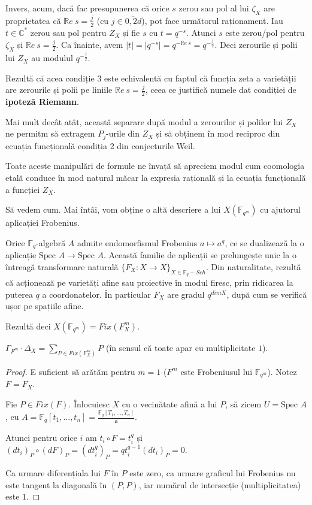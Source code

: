 \documentclass[13pt,openany]{book}
\begin{document}
Invers, acum, dacă fac presupunerea că orice $s$ zerou sau pol al lui $\zeta_X$ are proprietatea că $\mathbb{R}e\ s=\frac{j}{2}$ (cu $j\in\overline{0,2d}$), pot face următorul raționament. Iau $t \in \mathbb{C}^*$ zerou sau pol pentru $Z_X$ și fie $s$ cu $t=q^{-s}$. Atunci $s$ este zerou/pol pentru $\zeta_X$ și $\mathbb{R}e\ s=\frac{j}{2}$. Ca înainte, avem $\mid t\mid =\mid q^{-s}\mid =q^{-\mathbb{R}e\ s}=q^{-\frac{j}{2}}$. Deci zerourile și polii lui $Z_X$ au modulul $q^{-\frac{j}{2}}$.

Rezultă că acea condiție 3 este echivalentă cu faptul că funcția zeta a varietății are zerourile și polii pe liniile $\mathbb{R}e\ s=\frac{j}{2}$, ceea ce justifică numele dat condiției de {\bf ipoteză Riemann}.

Mai mult decât atât, această separare după modul a zerourilor și polilor lui $Z_X$ ne permitm să extragem $P_j$-urile din $Z_X$ și să obținem în mod reciproc din ecuația funcțională condiția 2 din conjecturile Weil.

Toate aceste manipulări de formule ne învață să apreciem modul cum coomologia etală conduce în mod natural măcar la expresia rațională și la ecuația funcțională a funcției $Z_X$.

Să vedem cum. Mai întâi, vom obține o altă descriere a lui $X(\mathbb{F}_{q^m})$ cu ajutorul aplicației Frobenius.

Orice $\mathbb{F}_q$-algebră $A$ admite endomorfismul Frobenius $a \mapsto a^q$, ce se dualizează la o aplicație $\text{Spec } A \rightarrow \text{Spec } A$. Această familie de aplicații se prelungește unic la o întreagă transformare naturală $\{F_X : X \rightarrow X\}_{X \in \mathbb{F}_q-Sch}$. Din naturalitate, rezultă că acționează pe varietăți afine sau proiective în modul firesc, prin ridicarea la puterea $q$ a coordonatelor. În particular $F_X$ are gradul $q^{dim X}$, după cum se verifică ușor pe spațiile afine.

Rezultă deci  $X(\mathbb{F}_{q^m})=Fix(F_X^m)$.

\begin{lema}
$\Gamma_{F^m} \cdot \Delta_X = \sum\limits_{P \in Fix(F_X^m)} P$ (în sensul că toate apar cu multiplicitate $1$).
\end{lema}

\begin{proof}
E suficient să arătăm pentru $m=1$ ($F^m$ este Frobeniusul lui $\mathbb{F}_{q^m}$). Notez $F=F_X$.

Fie $P\in Fix(F)$. Înlocuiesc $X$ cu o vecinătate afină a lui $P$, să zicem $U=\text{Spec }A$, cu $A=\mathbb{F}_q[t_1,...,t_n]=\frac{\mathbb{F}_q[T_1,...,T_n]}{\mathfrak{a}}$.

Atunci pentru orice $i$ am $t_i \circ F = t_i^q$ și $(dt_i)_P \circ (dF)_P = (dt_i^q)_P = qt_i^{q-1}(dt_i)_P = 0$.

Ca urmare diferențiala lui $F$ în $P$ este zero, ca urmare graficul lui Frobenius nu este tangent la diagonală în $(P,P)$, iar numărul de intersecție (multiplicitatea) este $1$. 
\end{proof}
\end{document}
